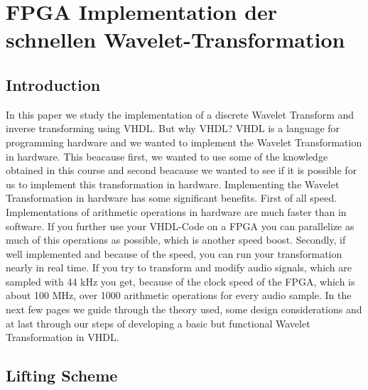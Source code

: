 %
%
%


\chapter{FPGA Implementation der schnellen Wavelet-Transformation\label{chapter:fpga}}
\begin{refsection}

\section{Introduction}
In this paper we study the implementation of a discrete Wavelet Transform and inverse transforming using VHDL.
But why VHDL? VHDL is a language for programming hardware and we wanted to implement the Wavelet Transformation in hardware.
This beacause first, we wanted to use some of the knowledge obtained in this course and second beacause we wanted to see if it is possible for us to implement this transformation in hardware.
Implementing the Wavelet Transformation in hardware has some significant benefits.
First of all speed. Implementations of arithmetic operations in hardware are much faster than in software.
If you further use your VHDL-Code on a FPGA you can parallelize as much of this operations as possible, which is another speed boost. 
Secondly, if well implemented and because of the speed, you can run your transformation nearly in real time.
If you try to transform and modify audio signals, which are sampled with 44 kHz you get, because of the clock speed of the FPGA, which is about 100 MHz, over 1000 arithmetic operations for every audio sample.
In the next few pages we guide through the theory used, some design considerations and at last through our steps of developing a basic but functional Wavelet Transformation in VHDL. 

\section{Lifting Scheme}


\end{refsection}
